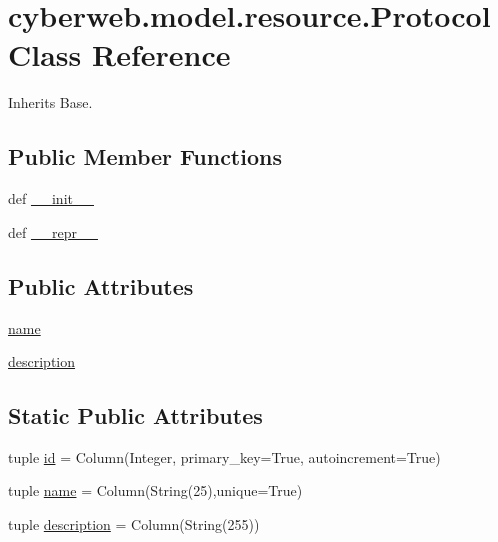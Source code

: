 \hypertarget{classcyberweb_1_1model_1_1resource_1_1_protocol}{\section{cyberweb.\-model.\-resource.\-Protocol \-Class \-Reference}
\label{classcyberweb_1_1model_1_1resource_1_1_protocol}
}


\-Inherits \-Base.

\subsection*{\-Public \-Member \-Functions}
\begin{DoxyCompactItemize}
\item 
def \hyperlink{classcyberweb_1_1model_1_1resource_1_1_protocol_a1445ec5824839cc10c504cd3dfe53138}{\-\_\-\-\_\-init\-\_\-\-\_\-}
\item 
def \hyperlink{classcyberweb_1_1model_1_1resource_1_1_protocol_a4dcd431dfaceb697940a4c8889b9406c}{\-\_\-\-\_\-repr\-\_\-\-\_\-}
\end{DoxyCompactItemize}
\subsection*{\-Public \-Attributes}
\begin{DoxyCompactItemize}
\item 
\hyperlink{classcyberweb_1_1model_1_1resource_1_1_protocol_a3d0c3709f9ca35075b6479770dfcf234}{name}
\item 
\hyperlink{classcyberweb_1_1model_1_1resource_1_1_protocol_a79ed4a83e0f1aac1f63bbbab2501daa4}{description}
\end{DoxyCompactItemize}
\subsection*{\-Static \-Public \-Attributes}
\begin{DoxyCompactItemize}
\item 
tuple \hyperlink{classcyberweb_1_1model_1_1resource_1_1_protocol_af0b50a9258e5b48cb9fbd7dc3bdca69f}{id} = \-Column(\-Integer, primary\-\_\-key=\-True, autoincrement=\-True)
\item 
tuple \hyperlink{classcyberweb_1_1model_1_1resource_1_1_protocol_abed3416d28804b8023338a1f77e4ac2b}{name} = \-Column(\-String(25),unique=\-True)
\item 
tuple \hyperlink{classcyberweb_1_1model_1_1resource_1_1_protocol_a9784a5b0204120cf2d0ae9c1b6415e57}{description} = \-Column(\-String(255))
\end{DoxyCompactItemize}



